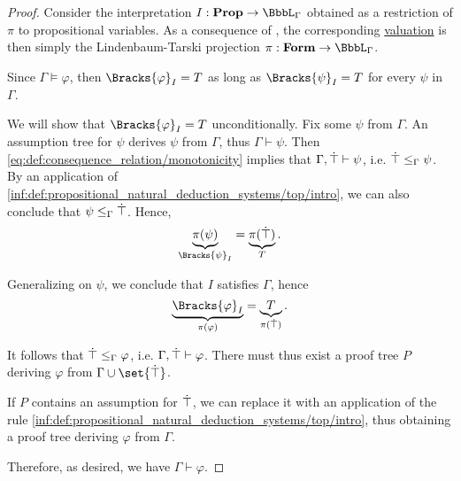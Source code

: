 \begin{proof}
  Consider the interpretation \( I: \op*{Prop} \to \BbbL_\Gamma \) obtained as a restriction of \( \pi \) to propositional variables. As a consequence of , the corresponding \hyperref[def:propositional_valuation/formula_valuation]{valuation} is then simply the Lindenbaum-Tarski projection \( \pi: \op*{Form} \to \BbbL_\Gamma \).

  Since \( \Gamma \vDash \varphi \), then \( \Bracks{\varphi}_I = T \) as long as \( \Bracks{\psi}_I = T \) for every \( \psi \) in \( \Gamma \).

  We will show that \( \Bracks{\varphi}_I = T \) unconditionally. Fix some \( \psi \) from \( \Gamma \). An assumption tree for \( \psi \) derives \( \psi \) from \( \Gamma \), thus \( \Gamma \vdash \psi \). Then \eqref{eq:def:consequence_relation/monotonicity} implies that \( \Gamma, \dot{\top} \vdash \psi \), i.e. \( \dot{\top} \leq_\Gamma \psi \). By an application of \ref{inf:def:propositional_natural_deduction_systems/top/intro}, we can also conclude that \( \psi \leq_\Gamma \dot{\top} \). Hence,
  \begin{equation*}
    \underbrace{\pi(\psi)}_{\Bracks{\psi}_I} = \underbrace{\pi(\syntop)}_{T}.
  \end{equation*}

  Generalizing on \( \psi \), we conclude that \( I \) satisfies \( \Gamma \), hence
  \begin{equation*}
    \underbrace{\Bracks{\varphi}_I}_{\pi(\varphi)} = \underbrace{T}_{\pi(\syntop)}.
  \end{equation*}

  It follows that \( \dot{\top} \leq_\Gamma \varphi \), i.e. \( \Gamma, \dot{\top} \vdash \varphi \). There must thus exist a proof tree \( P \) deriving \( \varphi \) from \( \Gamma \cup \set{ \syntop } \).

  If \( P \) contains an assumption for \( \dot{\top} \), we can replace it with an application of the rule \ref{inf:def:propositional_natural_deduction_systems/top/intro}, thus obtaining a proof tree deriving \( \varphi \) from \( \Gamma \).

  Therefore, as desired, we have \( \Gamma \vdash \varphi \).
\end{proof}


